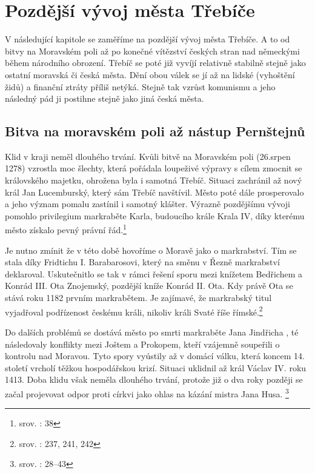 \documentclass[a4paper,oneside,12p]{report}
\begin{document}
\chapter{Pozdější vývoj města Třebíče}

V následující kapitole se zaměříme na pozdější vývoj města Třebíče.
A to od bitvy na Moravském poli až po konečné vítězství českých stran nad německými během národního obrození.
Třebíč se poté již vyvíjí relativně stabilně stejně jako ostatní moravská či česká města.
Dění obou válek se jí až na lidské (vyhoštění židů) a finanční ztráty příliš netýká.
Stejně tak vzrůst komunismu a jeho následný pád ji postihne stejně jako jiná česká města.

\section{Bitva na moravském poli až nástup Pernštejnů}

Klid v kraji neměl dlouhého trvání.
Kvůli bitvě na Moravském poli (26.srpen 1278) vzrostla moc šlechty, která pořádala loupeživé výpravy s cílem zmocnit se královského majetku, ohrožena byla i samotná Třebíč.
Situaci zachránil až nový král Jan Lucemburský, který sám Třebíč navštívil.
Město poté dále prosperovalo a jeho význam pomalu zastínil i samotný klášter.
Výrazně pozdějšímu vývoji pomohlo privilegium markraběte Karla, budoucího krále Krala IV, díky kterému město získalo pevný právní řád.\footnote{srov. \cite{Uhlir1978}: 38}

Je nutno zmínit že v této době hovoříme o Moravě jako o markrabství.
Tím se stala díky Fridtichu I. Barabarosovi, který na směnu v Řezně markrabství deklaroval.
Uskutečnitlo se tak v rámci řešení sporu mezi knížetem Bedřichem a Konrád III. Ota Znojemský, pozdější kníže Konrád II. Ota.
Kdy právě Ota se stává roku 1182 prvním markrabětem.
Je zajímavé, že markrabský titul vyjadřoval podřízenost českému králi, nikoliv králi Svaté říše římské.\footnote{srov. : 237, 241, 242}

Do dalších problémů se dostává město po smrti markraběte Jana Jindřicha , té následovaly konflikty mezi Joštem a Prokopem, kteří vzájemně soupeřili o kontrolu nad Moravou.
Tyto spory vyústily až v domácí válku, která koncem 14. století vrcholí těžkou hospodářskou krizí.
Situaci uklidnil až král Václav IV. roku 1413.
Doba klidu však neměla dlouhého trvání, protože již o dva roky později se začal projevovat odpor proti církvi jako ohlas na kázání mistra Jana Husa. \footnote{srov. \cite{Uhlir1978}: 28--43}
\end{document}
